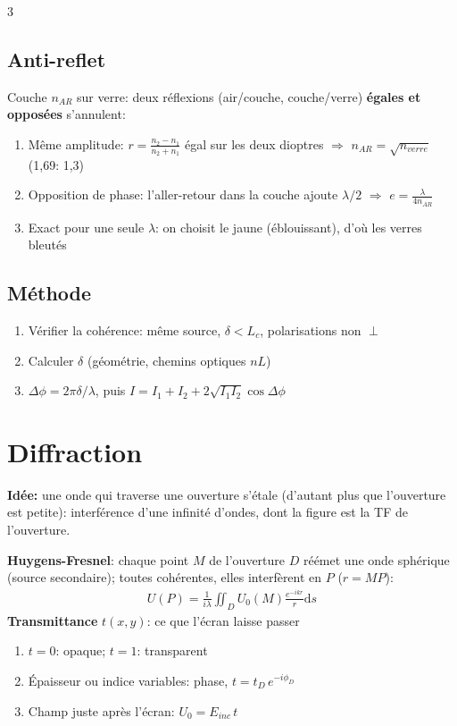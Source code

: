 \documentclass[12pt, a4paper]{article}
\newcommand{\dd}{\mathrm{d}}
\begin{document}
\begin{multicols*}{3}
	\subsection{Anti-reflet}
	Couche $n_{AR}$ sur verre: deux réflexions (air/couche, couche/verre) \textbf{égales et opposées} s'annulent:
	\begin{enumerate}[\roman*.]
		\item Même amplitude: $r=\frac{n_2-n_1}{n_2+n_1}$ égal sur les deux dioptres $\Rightarrow$ $n_{AR}=\sqrt{n_{verre}}$ (1,69: 1,3)
		\item Opposition de phase: l'aller-retour dans la couche ajoute $\lambda/2$ $\Rightarrow$ $e=\frac{\lambda}{4n_{AR}}$
		\item Exact pour une seule $\lambda$: on choisit le jaune (éblouissant), d'où les verres bleutés
	\end{enumerate}

	\subsection{Méthode}
	\begin{enumerate}[\roman*.]
		\item Vérifier la cohérence: même source, $\delta<L_c$, polarisations non $\perp$
		\item Calculer $\delta$ (géométrie, chemins optiques $nL$)
		\item $\Delta\phi=2\pi\delta/\lambda$, puis $I=I_1+I_2+2\sqrt{I_1I_2}\cos\Delta\phi$
	\end{enumerate}

	\colbreak
	\section{Diffraction}
	\textbf{Idée:} une onde qui traverse une ouverture s'étale (d'autant plus que l'ouverture est petite): interférence d'une infinité d'ondes, dont la figure est la TF de l'ouverture.

	\textbf{Huygens-Fresnel}: chaque point $M$ de l'ouverture $D$ réémet une onde sphérique (source secondaire); toutes cohérentes, elles interfèrent en $P$ ($r=MP$):
	\begin{gather*}
		U(P)=\frac{1}{i\lambda}\iint_DU_0(M)\frac{e^{-ikr}}{r}\dd s
	\end{gather*}
	\textbf{Transmittance} $t(x,y)$: ce que l'écran laisse passer
	\begin{enumerate}[\roman*.]
		\item $t=0$: opaque; $t=1$: transparent
		\item Épaisseur ou indice variables: phase, $t=t_D\,e^{-i\phi_D}$
		\item Champ juste après l'écran: $U_0=E_{inc}\,t$
	\end{enumerate}


\end{multicols*}
\end{document}
